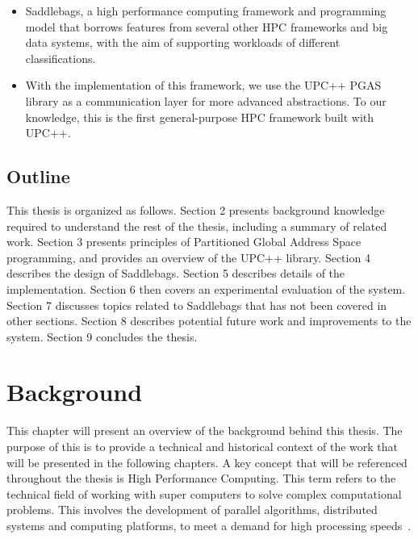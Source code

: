 \documentclass{uit-report}
\begin{document}
\begin{itemize}
	\item Saddlebags, a high performance computing framework and programming model that borrows features from several other HPC frameworks and big data systems, with the aim of supporting workloads of different classifications.
	\item With the implementation of this framework, we use the UPC++ PGAS library as a communication layer for more advanced abstractions. To our knowledge, this is the first general-purpose HPC framework built with UPC++.
\end{itemize}









\section{Outline}
This thesis is organized as follows. Section 2 presents background knowledge required to understand the rest of the thesis, including a summary of related work. Section 3 presents principles of Partitioned Global Address Space programming, and provides an overview of the UPC++ library. Section 4 describes the design of Saddlebags. Section 5 describes details of the implementation. Section 6 then covers an experimental evaluation of the system. Section 7 discusses topics related to Saddlebags that has not been covered in other sections. Section 8 describes potential future work and improvements to the system. Section 9 concludes the thesis.

\newpage
\mbox{} \pagebreak
\chapter{Background}
This chapter will present an overview of the background behind this thesis. The purpose of this is to provide a technical and historical context of the work that will be presented in the following chapters. A key concept that will be referenced throughout the thesis is High Performance Computing. This term refers to the technical field of working with super computers to solve complex computational problems. This involves the development of parallel algorithms, distributed systems and computing platforms, to meet a demand for high processing speeds~\cite{hpc_def}.
\end{document}
